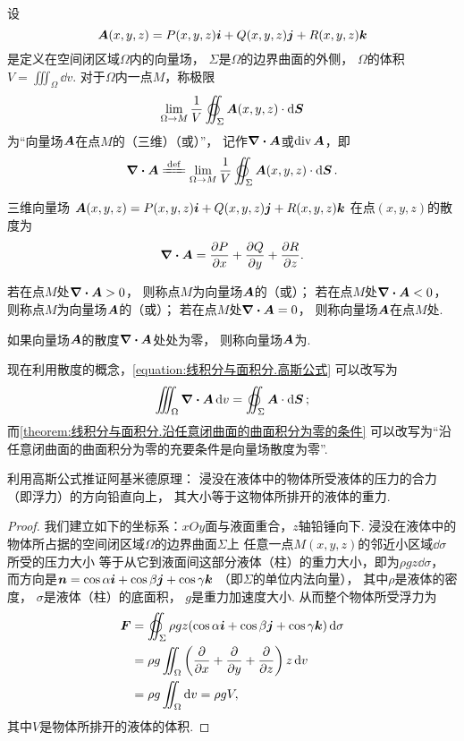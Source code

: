 \begin{definition}[空间中的散度]
\def\defofdiv{\lim\limits_{\Omega \to M} \frac{1}{V} \varoiint_\Sigma \vb{A}(x,y,z) \cdot \dd{\vb{S}}}%
设\[
\boldsymbol{A}(x,y,z)=P(x,y,z)\boldsymbol{i}+Q(x,y,z)\boldsymbol{j}+R(x,y,z)\boldsymbol{k}
\]是定义在空间闭区域\(\Omega\)内的向量场，
\(\Sigma\)是\(\Omega\)的边界曲面的外侧，
\(\Omega\)的体积\(V = \iiint_{\Omega} \dd{v}\).
对于\(\Omega\)内一点\(M\)，称极限\[
	\defofdiv
\]为“向量场\(\boldsymbol{A}\)在点\(M\)的（三维）（或）”，
记作\(\div{\boldsymbol{A}}\)或\(\operatorname{div}\boldsymbol{A}\)，即\[
	\div{\vb{A}} \defeq \defofdiv.
\]
\end{definition}

\begin{proposition}
三维向量场
\(\boldsymbol{A}(x,y,z)=P(x,y,z)\boldsymbol{i}+Q(x,y,z)\boldsymbol{j}+R(x,y,z)\boldsymbol{k}\)
在点\((x,y,z)\)的散度为\[
	\div{\boldsymbol{A}} = \pdv{P}{x}+\pdv{Q}{y}+\pdv{R}{z}.
\]
\end{proposition}

\begin{definition}
若在点\(M\)处\(\div{\boldsymbol{A}}>0\)，
则称点\(M\)为向量场\(\boldsymbol{A}\)的（或）；
若在点\(M\)处\(\div{\boldsymbol{A}}<0\)，
则称点\(M\)为向量场\(\boldsymbol{A}\)的（或）；
若在点\(M\)处\(\div{\boldsymbol{A}}=0\)，
则称向量场\(\boldsymbol{A}\)在点\(M\)处.

如果向量场\(\boldsymbol{A}\)的散度\(\div{\boldsymbol{A}}\)处处为零，
则称向量场\(\boldsymbol{A}\)为.
\end{definition}

现在利用散度的概念，\cref{equation:线积分与面积分.高斯公式} 可以改写为
\begin{equation}\label{equation:线积分与面积分.高斯公式1}
	\iiint_{\Omega} \div{\vb{A}} \dd{v} = \varoiint_\Sigma \vb{A} \cdot \dd{\vb{S}};
\end{equation}
而\cref{theorem:线积分与面积分.沿任意闭曲面的曲面积分为零的条件}
可以改写为“沿任意闭曲面的曲面积分为零的充要条件是向量场散度为零”.

\begin{example}
利用高斯公式推证阿基米德原理：
浸没在液体中的物体所受液体的压力的合力（即浮力）的方向铅直向上，
其大小等于这物体所排开的液体的重力.
\begin{proof}
我们建立如下的坐标系：\(xOy\)面与液面重合，\(z\)轴铅锤向下.
浸没在液体中的物体所占据的空间闭区域\(\Omega\)的边界曲面\(\Sigma\)上
任意一点\(M(x,y,z)\)的邻近小区域\(\dd{\sigma}\)所受的压力大小
等于从它到液面间这部分液体（柱）的重力大小，即为\(\rho g z \dd{\sigma}\)，
而方向是\(\boldsymbol{n}=\cos\alpha\boldsymbol{i}+\cos\beta\boldsymbol{j}+\cos\gamma\boldsymbol{k}\)
（即\(\Sigma\)的单位内法向量），
其中\(\rho\)是液体的密度，
\(\sigma\)是液体（柱）的底面积，
\(g\)是重力加速度大小.
从而整个物体所受浮力为\begin{align*}
	\vb{F}
	&= \varoiint_\Sigma \rho g z
		(\cos\alpha\vb{i}+\cos\beta\vb{j}+\cos\gamma\vb{k}) \dd{\sigma} \\
	&= \rho g \iint_{\Omega} \left(\pdv{x}+\pdv{y}+\pdv{z}\right) z \dd{v} \\
	&= \rho g \iint_{\Omega} \dd{v}
	= \rho g V,
\end{align*}
其中\(V\)是物体所排开的液体的体积.
\end{proof}
\end{example}
